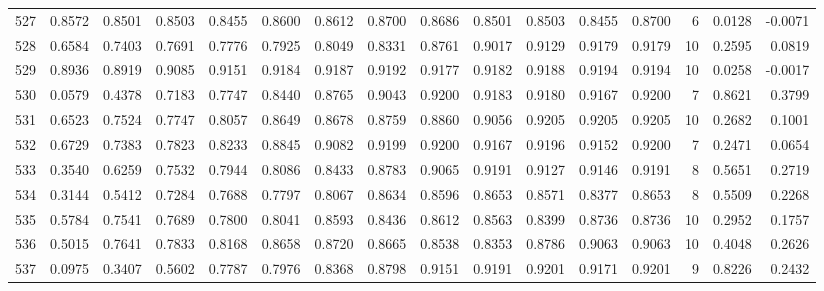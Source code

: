 \begin{tabular}{lrrrrrrrrrrrrrrr}
527 &      0.8572 &  0.8501 &  0.8503 &  0.8455 &  0.8600 &  0.8612 &  0.8700 &  0.8686 &  0.8501 &  0.8503 &   0.8455 &     0.8700 &      6 &                    0.0128 &                    -0.0071 \\
528 &      0.6584 &  0.7403 &  0.7691 &  0.7776 &  0.7925 &  0.8049 &  0.8331 &  0.8761 &  0.9017 &  0.9129 &   0.9179 &     0.9179 &     10 &                    0.2595 &                     0.0819 \\
529 &      0.8936 &  0.8919 &  0.9085 &  0.9151 &  0.9184 &  0.9187 &  0.9192 &  0.9177 &  0.9182 &  0.9188 &   0.9194 &     0.9194 &     10 &                    0.0258 &                    -0.0017 \\
530 &      0.0579 &  0.4378 &  0.7183 &  0.7747 &  0.8440 &  0.8765 &  0.9043 &  0.9200 &  0.9183 &  0.9180 &   0.9167 &     0.9200 &      7 &                    0.8621 &                     0.3799 \\
531 &      0.6523 &  0.7524 &  0.7747 &  0.8057 &  0.8649 &  0.8678 &  0.8759 &  0.8860 &  0.9056 &  0.9205 &   0.9205 &     0.9205 &     10 &                    0.2682 &                     0.1001 \\
532 &      0.6729 &  0.7383 &  0.7823 &  0.8233 &  0.8845 &  0.9082 &  0.9199 &  0.9200 &  0.9167 &  0.9196 &   0.9152 &     0.9200 &      7 &                    0.2471 &                     0.0654 \\
533 &      0.3540 &  0.6259 &  0.7532 &  0.7944 &  0.8086 &  0.8433 &  0.8783 &  0.9065 &  0.9191 &  0.9127 &   0.9146 &     0.9191 &      8 &                    0.5651 &                     0.2719 \\
534 &      0.3144 &  0.5412 &  0.7284 &  0.7688 &  0.7797 &  0.8067 &  0.8634 &  0.8596 &  0.8653 &  0.8571 &   0.8377 &     0.8653 &      8 &                    0.5509 &                     0.2268 \\
535 &      0.5784 &  0.7541 &  0.7689 &  0.7800 &  0.8041 &  0.8593 &  0.8436 &  0.8612 &  0.8563 &  0.8399 &   0.8736 &     0.8736 &     10 &                    0.2952 &                     0.1757 \\
536 &      0.5015 &  0.7641 &  0.7833 &  0.8168 &  0.8658 &  0.8720 &  0.8665 &  0.8538 &  0.8353 &  0.8786 &   0.9063 &     0.9063 &     10 &                    0.4048 &                     0.2626 \\
537 &      0.0975 &  0.3407 &  0.5602 &  0.7787 &  0.7976 &  0.8368 &  0.8798 &  0.9151 &  0.9191 &  0.9201 &   0.9171 &     0.9201 &      9 &                    0.8226 &                     0.2432 \\

\end{tabular}
